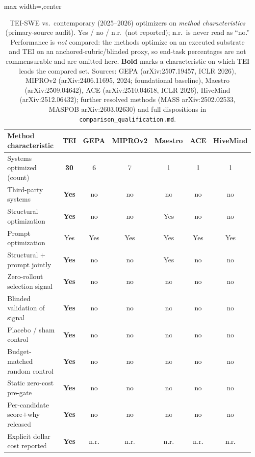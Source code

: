 \documentclass[11pt]{article}
\renewcommand{\arraystretch}{1.08}
\begin{document}
\begin{table}[t]\centering
\caption{TEI-SWE vs.\ contemporary (2025--2026) optimizers on \emph{method
characteristics} (primary-source audit). Yes / no / n.r.\ (not reported);
n.r.\ is never read as ``no.'' Performance is \emph{not} compared: the methods
optimize on an executed substrate and TEI on an anchored-rubric/blinded proxy,
so end-task percentages are not commensurable and are omitted here. \textbf{Bold}
marks a characteristic on which TEI leads the compared set. Sources: GEPA
(arXiv:2507.19457, ICLR 2026), MIPROv2 (arXiv:2406.11695, 2024; foundational
baseline), Maestro (arXiv:2509.04642), ACE (arXiv:2510.04618, ICLR 2026),
HiveMind (arXiv:2512.06432); further resolved methods (MASS arXiv:2502.02533,
MASPOB arXiv:2603.02630) and full dispositions in
\texttt{comparison\_qualification.md}.}
\label{tab:compare}\small
\setlength{\tabcolsep}{4.5pt}\renewcommand{\arraystretch}{1.18}
\begin{adjustbox}{max width=\linewidth,center}%
\begin{tabular}{@{}lcccccc@{}}
\toprule
Method characteristic & \textbf{TEI} & GEPA & MIPROv2 & Maestro & ACE & HiveMind \\
\midrule
Systems optimized (count)        & \textbf{30}  & 6   & 7   & 1   & 1   & 1   \\
Third-party systems              & \textbf{Yes} & no  & no  & no  & no  & no  \\
Structural optimization          & \textbf{Yes} & no  & no  & Yes & no  & no  \\
Prompt optimization              & Yes          & Yes & Yes & Yes & Yes & Yes \\
Structural $+$ prompt jointly     & \textbf{Yes} & no  & no  & Yes & no  & no  \\
Zero-rollout selection signal    & \textbf{Yes} & no  & no  & no  & no  & no  \\
Blinded validation of signal     & \textbf{Yes} & no  & no  & no  & no  & no  \\
Placebo / sham control           & \textbf{Yes} & no  & no  & no  & no  & no  \\
Budget-matched random control    & \textbf{Yes} & no  & no  & no  & no  & no  \\
Static zero-cost pre-gate        & \textbf{Yes} & no  & no  & no  & no  & no  \\
Per-candidate score$+$why released & \textbf{Yes} & no  & no  & no  & no  & no  \\
Explicit dollar cost reported    & \textbf{Yes} & n.r.& n.r.& n.r.& n.r.& n.r.\\
\bottomrule
\end{tabular}\end{adjustbox}
\end{table}
\end{document}

